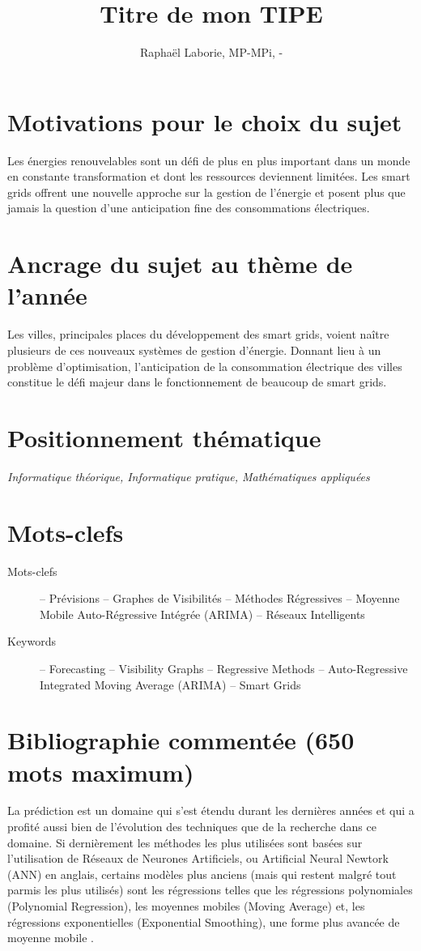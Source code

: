 \documentclass[12pt,a4paper]{article}
\title{Titre de mon TIPE}
\author{Raphaël Laborie, MP\oldstylenums{1}-MPi, \oldstylenums{\the\year}-\oldstylenums{\arabic{nextyear}} }
\newcommand{\positionnementThematique}[1]{
\section*{Positionnement thématique}
{\it #1}}
\newcommand{\motclefs}[2]{
    \section*{Mots-clefs}
        \begin{description}
            \item[Mots-clefs] -- #1 
            \item[Keywords]   -- #2
        \end{description}
}
\begin{document}
\maketitle
\section*{Motivations pour le choix du sujet}
Les énergies renouvelables sont un défi de plus en plus important dans un monde en constante transformation et dont les ressources deviennent limitées.
Les smart grids offrent une nouvelle approche sur la gestion de l'énergie et posent plus que jamais la question d'une anticipation fine des consommations électriques.
\section*{Ancrage du sujet au thème de l'année}
Les villes, principales places du développement des smart grids, voient naître plusieurs de ces nouveaux systèmes de gestion d'énergie. Donnant lieu à un problème d'optimisation, l'anticipation de la consommation électrique des villes constitue le défi majeur dans le fonctionnement de beaucoup de smart grids.
\positionnementThematique{Informatique théorique, Informatique pratique, Mathématiques appliquées}
\motclefs{Prévisions -- Graphes de Visibilités -- Méthodes Régressives -- Moyenne Mobile Auto-Régressive Intégrée (ARIMA) -- Réseaux Intelligents}{Forecasting -- Visibility Graphs -- Regressive Methods -- Auto-Regressive Integrated Moving Average (ARIMA) -- Smart Grids}
\section*{Bibliographie commentée (650 mots maximum)}

La prédiction est un domaine qui s'est étendu durant les dernières années et qui a profité aussi bien de l'évolution des techniques que de la recherche dans ce domaine. Si dernièrement les méthodes les plus utilisées sont basées sur l'utilisation de Réseaux de Neurones Artificiels, ou Artificial Neural Newtork (ANN) en anglais, certains modèles plus anciens (mais qui restent malgré tout parmis les plus utilisés) sont les régressions telles que les régressions polynomiales (Polynomial Regression), les moyennes mobiles (Moving Average) et, les régressions exponentielles (Exponential Smoothing), une forme plus avancée de moyenne mobile \cite{exporeview}.
\end{document}
